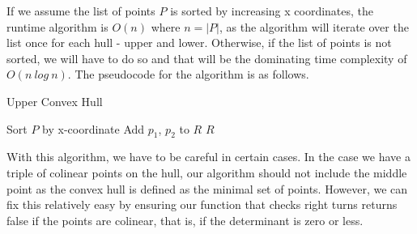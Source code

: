 \documentclass[10pt]{article}
\begin{document}
\begin{multicols}{2}
\indent If we assume the list of points $P$ is sorted by increasing x coordinates, the runtime algorithm is $O(n)$ where $n = |P|$, as the algorithm will iterate over the list once for each hull - upper and lower. Otherwise, if the list of points is not sorted, we will have to do so and that will be the dominating time complexity of $O(n\ log\ n)$.  The pseudocode for the algorithm is as follows. \newline \\
\begin{algorithm}[H]
\caption{Upper Convex Hull}
\SetAlgoLined
{}
Sort $P$ by x-coordinate\;
Add $p_1$, $p_2$ to $R$\;
\Return $R$\;
\end{algorithm}
\vspace*{3ex}
With this algorithm, we have to be careful in certain cases. In the case we have a triple of colinear points on the hull, our algorithm should not include the middle point as the convex hull is defined as the minimal set of points. However, we can fix this relatively easy by ensuring our function that checks right turns returns false if the points are colinear, that is, if the determinant is zero or less.

\end{multicols}
\end{document}

